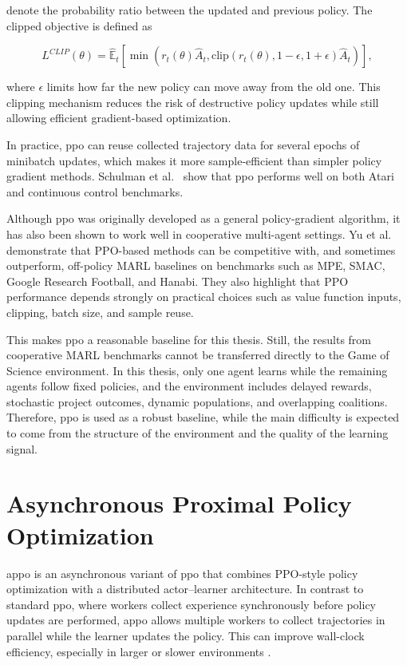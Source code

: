 \documentclass[english,bachelor]{hsluthesis}
\begin{document}
denote the probability ratio between the updated and previous policy. The clipped objective is defined as

\begin{equation}
L^{CLIP}(\theta) =
\hat{\mathbb{E}}_t \left[
\min \left(
r_t(\theta)\hat{A}_t,
\text{clip}(r_t(\theta), 1-\epsilon, 1+\epsilon)\hat{A}_t
\right)
\right],
\end{equation}

where $\epsilon$ limits how far the new policy can move away from the old one. This clipping mechanism reduces the risk of destructive policy updates while still allowing efficient gradient-based optimization.

In practice, \gls{ppo} can reuse collected trajectory data for several epochs of minibatch updates, which makes it more sample-efficient than simpler policy gradient methods. Schulman et al.~\cite{schulman2017proximalpolicyoptimizationalgorithms} show that \gls{ppo} performs well on both Atari and continuous control benchmarks.

Although \gls{ppo} was originally developed as a general policy-gradient algorithm, it has also been shown to work well in cooperative multi-agent settings. Yu et al.~\cite{NEURIPS2022_9c1535a0} demonstrate that PPO-based methods can be competitive with, and sometimes outperform, off-policy MARL baselines on benchmarks such as MPE, SMAC, Google Research Football, and Hanabi. They also highlight that PPO performance depends strongly on practical choices such as value function inputs, clipping, batch size, and sample reuse.

This makes \gls{ppo} a reasonable baseline for this thesis. Still, the results from cooperative MARL benchmarks cannot be transferred directly to the Game of Science environment. In this thesis, only one agent learns while the remaining agents follow fixed policies, and the environment includes delayed rewards, stochastic project outcomes, dynamic populations, and overlapping coalitions. Therefore, \gls{ppo} is used as a robust baseline, while the main difficulty is expected to come from the structure of the environment and the quality of the learning signal.

\section{Asynchronous Proximal Policy Optimization}

\gls{appo} is an asynchronous variant of \gls{ppo} that combines PPO-style policy optimization with a distributed actor--learner architecture. In contrast to standard \gls{ppo}, where workers collect experience synchronously before policy updates are performed, \gls{appo} allows multiple workers to collect trajectories in parallel while the learner updates the policy. This can improve wall-clock efficiency, especially in larger or slower environments \cite{DBLP:journals/corr/abs-1912-00167}.
\end{document}
